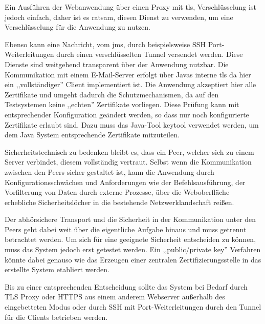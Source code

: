 \documentclass[oneside, ngerman, toc=bibliography,bibliography=totoc,listof=entryprefix, open=right,numbers=noenddot,fontsize=12pt]{scrbook}
\begin{document}
Ein Ausführen der Webanwendung über einen Proxy mit \acrfull{tls}, Verschlüsselung ist jedoch einfach, daher ist es ratsam, diesen Dienst zu verwenden, um eine Verschlüsselung für die Anwendung zu nutzen.

Ebenso kann eine Nachricht, vom \acrshort{jms}, durch beispielsweise SSH Port-Weiterleitungen durch einen verschlüsselten Tunnel versendet werden. Diese Dienste sind weitgehend transparent über der Anwendung nutzbar.
Die Kommunikation mit einem E-Mail-Server erfolgt über Javas interne \acrshort{tls}  da hier ein ,,vollständiger'' Client implementiert ist. Die Anwendung akzeptiert hier alle Zertifikate und umgeht dadurch die Schutzmechanismen, da auf den Testsystemen keine ,,echten'' Zertifikate vorliegen.
Diese Prüfung kann mit entsprechender Konfiguration geändert werden, so dass nur noch konfigurierte Zertifikate erlaubt sind. Dazu muss das Java-Tool keytool verwendet werden, um dem Java System entsprechende Zertifikate mitzuteilen.

Sicherheitstechnisch zu bedenken bleibt es, dass ein Peer, welcher sich zu einem Server verbindet, diesem vollständig vertraut.
Selbst wenn die Kommunikation zwischen den Peers sicher gestaltet ist, kann die Anwendung durch Konfigurationsschwächen und Anforderungen wie der Befehlsausführung, der Vorfilterung von Daten durch externe Prozesse, über die  Weboberfläche erhebliche Sicherheitslöcher in die bestehende Netzwerklandschaft reißen.

Der abhörsichere Transport und die Sicherheit in der Kommunikation unter den Peers geht dabei weit über die eigentliche Aufgabe hinaus und muss getrennt betrachtet werden. Um sich für eine geeignete Sicherheit entscheiden zu können, muss das System jedoch erst getestet werden. Ein ,,public/private key'' Verfahren könnte dabei genauso wie das Erzeugen einer zentralen Zertifizierungsstelle in das erstellte System etabliert werden.

Bis zu einer entsprechenden Entscheidung sollte das System bei Bedarf durch TLS Proxy oder HTTPS aus einem anderem Webserver außerhalb des eingebetteten Modus  oder durch SSH mit Port-Weiterleitungen durch den Tunnel für die Clients betrieben werden.


 
\end{document}
